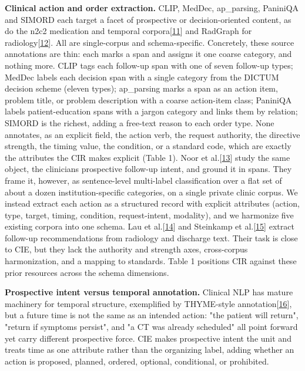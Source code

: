\documentclass[3p,twocolumn]{elsarticle}
\begin{document}
\textbf{Clinical action and order extraction.} CLIP, MedDec, ap\_parsing, PaniniQA and SIMORD each target a facet of prospective or decision-oriented content, as do the n2c2 medication and temporal corpora{[}\hyperref[r11]{11}{]} and RadGraph for radiology{[}\hyperref[r12]{12}{]}. All are single-corpus and schema-specific. Concretely, these source annotations are thin: each marks a span and assigns it one coarse category, and nothing more. CLIP tags each follow-up span with one of seven follow-up types; MedDec labels each decision span with a single category from the DICTUM decision scheme (eleven types); ap\_parsing marks a span as an action item, problem title, or problem description with a coarse action-item class; PaniniQA labels patient-education spans with a jargon category and links them by relation; SIMORD is the richest, adding a free-text reason to each order type. None annotates, as an explicit field, the action verb, the request authority, the directive strength, the timing value, the condition, or a standard code, which are exactly the attributes the CIR makes explicit (Table 1). Noor et al.{[}\hyperref[r13]{13}{]} study the same object, the clinician\textquotesingle s prospective follow-up intent, and ground it in spans. They frame it, however, as sentence-level multi-label classification over a flat set of about a dozen institution-specific categories, on a single private clinic corpus. We instead extract each action as a structured record with explicit attributes (action, type, target, timing, condition, request-intent, modality), and we harmonize five existing corpora into one schema. Lau et al.{[}\hyperref[r14]{14}{]} and Steinkamp et al.{[}\hyperref[r15]{15}{]} extract follow-up recommendations from radiology and discharge text. Their task is close to CIE, but they lack the authority and strength axes, cross-corpus harmonization, and a mapping to standards. Table 1 positions CIR against these prior resources across the schema dimensions.

\textbf{Prospective intent versus temporal annotation.} Clinical NLP has mature machinery for temporal structure, exemplified by THYME-style annotation{[}\hyperref[r16]{16}{]}, but a future time is not the same as an intended action: "the patient will return", "return if symptoms persist", and "a CT was already scheduled" all point forward yet carry different prospective force. CIE makes prospective intent the unit and treats time as one attribute rather than the organizing label, adding whether an action is proposed, planned, ordered, optional, conditional, or prohibited.
\end{document}
